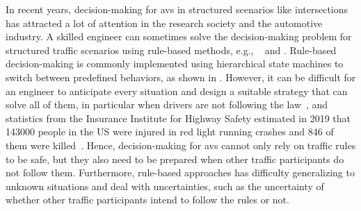 In recent years, decision-making for \gls{av}s in structured scenarios like intersections has attracted a lot of attention in the research society and the automotive industry. A skilled engineer can sometimes solve the decision-making problem for structured traffic scenarios using rule-based methods, e.g., ~\cite{Fletcher2008} and \cite{darpa2008}. Rule-based decision-making is commonly implemented using hierarchical state machines to switch between predefined behaviors, as shown in \cite{Fletcher2008}. However, it can be difficult for an engineer to anticipate every situation and design a suitable strategy that can solve all of them, in particular when drivers are not following the law~\cite{Althoff2021}, and statistics from the Insurance Institute for Highway Safety estimated in \num{2019} that \num{143000} people in the US were injured in red light running crashes and \num{846} of them were killed~\cite{IIHS2019}. 
Hence, decision-making for \gls{av}s cannot only rely on traffic rules to be safe, but they also need to be prepared when other traffic participants do not follow them. Furthermore, rule-based approaches has difficulty generalizing to unknown situations and deal with uncertainties, such as the uncertainty of whether other traffic participants intend to follow the rules or not.

